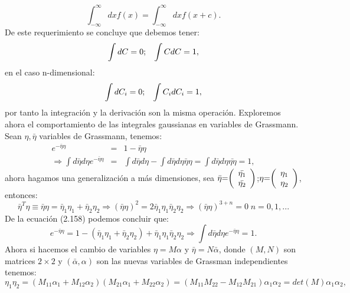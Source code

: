\begin{equation}
\int_{-\infty}^{\infty}dxf(x)=\int_{-\infty}^{\infty}dxf(x+c) .
\end{equation}
De este requerimiento se concluye que debemos tener:
\begin{equation}
\int dC=0; \hspace{0.3 cm} \int CdC=1,
\end{equation}
en el caso n-dimensional:
\begin{equation}
\int dC_i=0; \hspace{0.3 cm} \int C_idC_i=1, 
\end{equation}
por tanto la integración y la derivación son la misma operación. Exploremos ahora el comportamiento de las integrales gaussianas en variables de Grassmann. Sean $\eta,\bar{\eta}$ variables de Grassmann, tenemos:
\begin{eqnarray}
e^{-\bar{\eta}\eta}&=&1-\bar{\eta}\eta\\
\Rightarrow\int d\bar{\eta}d\eta e^{-\bar{\eta}\eta}&=&\int d\bar{\eta}d\eta-\int d\bar{\eta}d\eta\bar{\eta}\eta=\int d\bar{\eta}d\eta\bar{\eta\eta}=1,
\end{eqnarray}
ahora hagamos una generalización a más dimensiones, sea $\text{\ensuremath{\bar{\eta}}=\ensuremath{\left(\begin{array}{c}
\bar{\eta_{1}}\\
\bar{\eta_{2}}
\end{array}\right)}}$;$\text{\ensuremath{\eta}=\ensuremath{\left(\begin{array}{c}
\eta_{1}\\
\eta_{2}
\end{array}\right)}}$, entonces:
\begin{equation}
\bar{\eta}^T\eta\equiv \bar{\eta}\eta=\bar{\eta}_1\eta_1+\bar{\eta}_2\eta_2\Rightarrow (\bar{\eta}\eta)^2=2\bar{\eta}_1\eta_1\bar{\eta}_2\eta_2\Rightarrow (\bar{\eta}\eta)^{3+n}=0 \;n=0,1,... 
\end{equation}
De la ecuación (2.158) podemos concluir que:
\begin{equation}
e^{-\bar{\eta}\eta}=1-(\bar{\eta}_1\eta_1+\bar{\eta}_2\eta_2)+\bar{\eta}_1\eta_1\bar{\eta}_2\eta_2\Rightarrow \int d\bar{\eta}d\eta e^{-\bar{\eta}\eta}=1.
\end{equation}
Ahora si hacemos el cambio de variables $\eta=M\alpha$ y $\bar{\eta}=N\bar{\alpha}$, donde $(M,N)$ son matrices $2\times 2$ y $(\bar{\alpha},\alpha)$ son las nuevas variables de Grassman independientes tenemos:
\begin{equation}
\eta_{1}\eta_{2}=(M_{11}\alpha_{1}+M_{12}\alpha_{2})(M_{21}\alpha_{1}+M_{22}\alpha_{2})=(M_{11}M_{22}-M_{12}M_{21})\alpha_{1}\alpha_{2}=det(M)\alpha_{1}\alpha_{2},
\end{equation}
